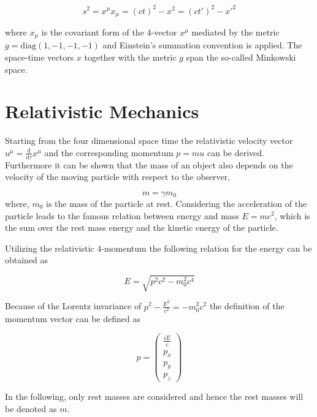 \begin{equation}\label{linvarianz}
 s^2 = x^\mu x_\mu =  \left(ct\right)^2 - x^2 = \left(ct'\right)^2 - x'^2 
\end{equation}

where $x_\mu$ is the covariant form of the 4-vector $x^\mu$ mediated by the
metric  $g= \mathrm{diag}(1,-1,-1,-1)$ and Einstein's summation convention is
applied.
The space-time vectors $x$ together with the metric $g$ span the so-called
Minkowski space.



\section{Relativistic Mechanics}
Starting from the four dimensional space time the relativistic velocity vector
$u^\mu = \frac{\mathrm{d}}{\mathrm{d}\tau} x^\mu$
and the corresponding momentum $p=mu$ can be derived.
Furthermore it can be shown that the mass of an object also depends on the
velocity of the moving particle with respect to the observer,

\begin{equation}\label{relmasse}
m = \gamma m_0
\end{equation}
where, $m_0$ is the
mass of the particle at rest.
Considering the acceleration of the particle leads to the famous relation between
energy and mass $E=mc^2$, which is the sum over the rest mass energy and the
kinetic energy of the particle.

Utilizing the relativistic 4-momentum the following relation for the energy
can be obtained as

\begin{equation}\label{relE}
E = \sqrt{p^2c^2 - m_0^2c^4}
\end{equation}

Because of the Lorentz invariance of $p^2 -\frac{E^2}{c^2} = -m_0^2c^2$
the definition of the momentum vector can be defined as

\begin{equation}\label{viererp}
{p} = \begin{pmatrix}\frac{iE}{c}\\p_x\\p_y\\p_z
\end{pmatrix}
\end{equation}

In the following, only rest masses are considered and hence the rest masses
will be denoted as $m$.



